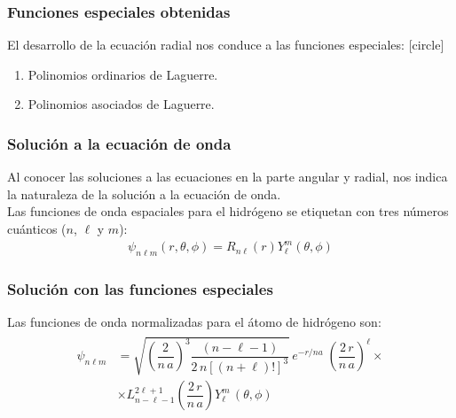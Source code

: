 \documentclass[12pt]{beamer}
\begin{document}
\begin{frame}
\frametitle{Funciones especiales obtenidas}
El desarrollo de la ecuación radial nos conduce a las funciones especiales:
[circle]
\begin{enumerate}[<+->]
\item Polinomios ordinarios de Laguerre.
\item Polinomios asociados de Laguerre.
\end{enumerate}
\end{frame}
\begin{frame}
\frametitle{Solución a la ecuación de onda}
Al conocer las soluciones a las ecuaciones en la parte angular y radial, nos indica la naturaleza de la solución a la ecuación de onda.
\\
\bigskip
\pause
Las funciones de onda espaciales para el hidrógeno se etiquetan con tres números cuánticos ($n$, $\ell$ y $m$):
\begin{align}
\psi_{n \ell m} (r, \theta, \phi) =  R_{n \ell} (r) Y_{\ell}^{m} (\theta, \phi)
\label{eq:ecuacion_04_74}
\end{align}
\end{frame}
\begin{frame}
\frametitle{Solución con las funciones especiales}
Las funciones de onda normalizadas para el átomo de hidrógeno son:
\begin{align}
\begin{aligned}
\psi_{n \ell m} &= \sqrt{\left(\dfrac{2}{n \, a} \right)^{3} \dfrac{(n - \ell - 1)}{2 \, n[(n + \ell)!]^{3}}} \, e^{-r/na} \; \left( \dfrac{2 \, r}{n \, a} \right)^{\ell} \times \\[1em]
&\times L_{n - \ell -1}^{2 \ell + 1} \left( \dfrac{2 \, r}{n \, a} \right) Y_{\ell}^{m} \, (\theta, \phi)
\end{aligned}
\label{eq:ecuacion_04_89}
\end{align}
\end{frame}
\end{document}
